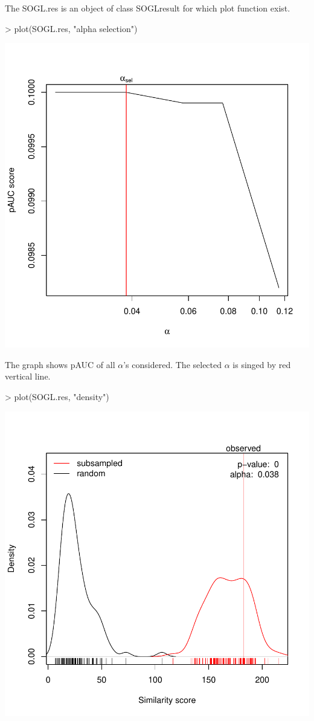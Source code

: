 \documentclass[a4paper]{report}
\begin{document}
The {\ttfamily SOGL.res} is an object of class {\ttfamily SOGLresult} for which plot function exist. 
\begin{Schunk}
\begin{Sinput}
> plot(SOGL.res, "alpha selection") 
\end{Sinput}
\end{Schunk}
\includegraphics{MAMA-006}

The graph shows pAUC of all $\alpha$'s considered. The selected $\alpha$ is singed by red vertical line. \par
\begin{Schunk}
\begin{Sinput}
> plot(SOGL.res, "density") 
\end{Sinput}
\end{Schunk}
\includegraphics{MAMA-007}
\end{document}
